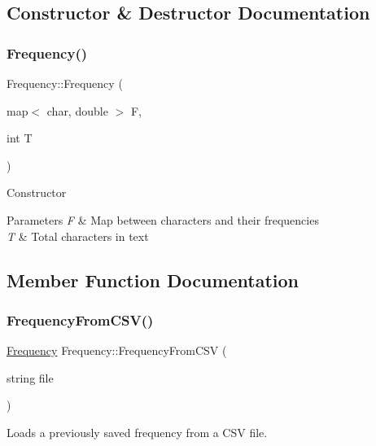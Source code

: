 \subsection{Constructor \& Destructor Documentation}
\mbox{\label{classFrequency_aee3a222d9a2c90ed28f3e08c20a661f3}} 
\subsubsection{\texorpdfstring{Frequency()}{Frequency()}}
{\footnotesize\ttfamily Frequency\+::\+Frequency (\begin{DoxyParamCaption}\item[{map$<$ char, double $>$}]{F,  }\item[{int}]{T }\end{DoxyParamCaption})}

Constructor


\begin{DoxyParams}{Parameters}
{\em F} & Map between characters and their frequencies \\
\hline
{\em T} & Total characters in text \\
\hline
\end{DoxyParams}


\subsection{Member Function Documentation}
\mbox{\label{classFrequency_afa743a740aba09aa200406693c11afe8}} 
\subsubsection{\texorpdfstring{Frequency\+From\+C\+S\+V()}{FrequencyFromCSV()}}
{\footnotesize\ttfamily \hyperlink{classFrequency}{Frequency} Frequency\+::\+Frequency\+From\+C\+SV (\begin{DoxyParamCaption}\item[{string}]{file }\end{DoxyParamCaption})\hspace{0.3cm}{\ttfamily [static]}}

Loads a previously saved frequency from a C\+SV file.


